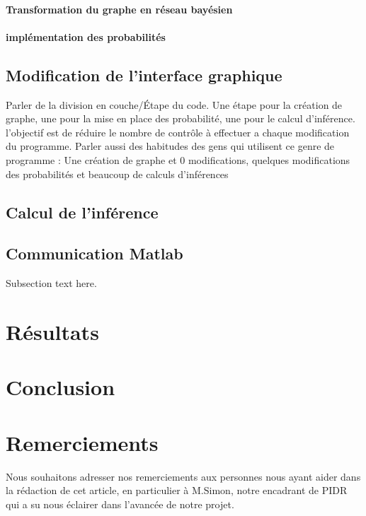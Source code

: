 \documentclass[conference]{IEEEtran}
\begin{document}
\paragraph{Transformation du graphe en réseau bayésien}

\paragraph{implémentation des probabilités}


\subsection{Modification de l'interface graphique }

Parler de la division en couche/Étape du code. Une étape pour la création de graphe, une pour la mise en place des probabilité, une pour le calcul d'inférence. l'objectif est de réduire le nombre de contrôle à effectuer a chaque modification du programme. Parler aussi des habitudes des gens qui utilisent ce genre de programme : Une création de graphe et 0 modifications, quelques modifications des probabilités et beaucoup de calculs d'inférences

\subsection{Calcul de l'inférence}

\subsection{Communication Matlab\Java}
Subsection text here.


\section{Résultats}

\section{Conclusion}

\section{Remerciements}
Nous souhaitons adresser nos remerciements aux personnes nous ayant aider dans la rédaction
de cet article, en particulier à M.Simon, notre encadrant de PIDR qui a su nous éclairer dans l'avancée de notre projet.
\end{document}
